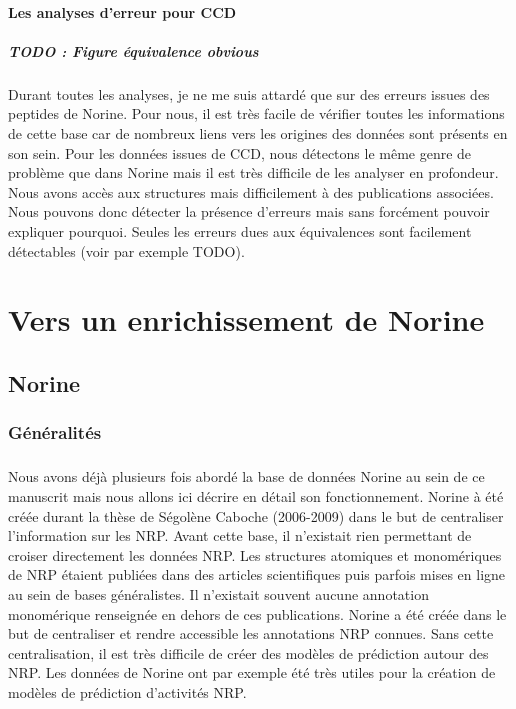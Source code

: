 \documentclass[12pt,french,twoside]{report}
\begin{document}
\subsubsection{Les analyses d'erreur pour CCD}

\paragraph{TODO : Figure équivalence obvious}

\paragraph{}Durant toutes les analyses, je ne me suis attardé que sur des erreurs issues des peptides de Norine.
Pour nous, il est très facile de vérifier toutes les informations de cette base car de nombreux liens vers les origines des données sont présents en son sein.
Pour les données issues de CCD, nous détectons le même genre de problème que dans Norine mais il est très difficile de les analyser en profondeur.
Nous avons accès aux structures mais difficilement à des publications associées.
Nous pouvons donc détecter la présence d'erreurs mais sans forcément pouvoir expliquer pourquoi.
Seules les erreurs dues aux équivalences sont facilement détectables (voir par exemple TODO).





\chapter{Vers un enrichissement de Norine}

\section{Norine}

\subsection{Généralités}

\paragraph{}Nous avons déjà plusieurs fois abordé la base de données Norine au sein de ce manuscrit mais nous allons ici décrire en détail son fonctionnement.
Norine à été créée durant la thèse de Ségolène Caboche (2006-2009) dans le but de centraliser l'information sur les NRP.
Avant cette base, il n'existait rien permettant de croiser directement les données NRP.
Les structures atomiques et monomériques de NRP étaient publiées dans des articles scientifiques puis parfois mises en ligne au sein de bases généralistes.
Il n'existait souvent aucune annotation monomérique renseignée en dehors de ces publications.
Norine a été créée dans le but de centraliser et rendre accessible les annotations NRP connues.
Sans cette centralisation, il est très difficile de créer des modèles de prédiction autour des NRP.
Les données de Norine ont par exemple été très utiles pour la création de modèles de prédiction d'activités NRP.
\end{document}

